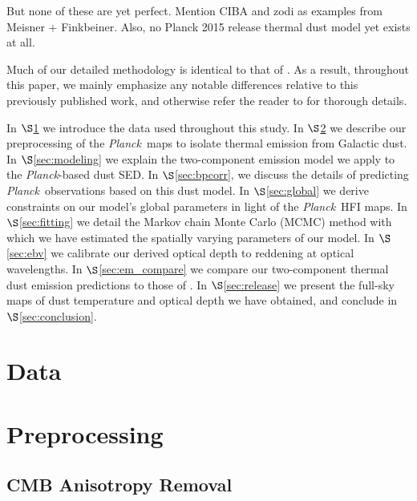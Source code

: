 \documentclass{emulateapj}
\newcommand{\PLANCK}{{\it Planck}}
\begin{document}
But none of these are yet perfect. Mention CIBA and zodi as examples from
Meisner + Finkbeiner. Also, no Planck 2015 release thermal dust model yet
exists at all.

Much of our detailed methodology is identical to that of \cite{meisner15}. As a
result, throughout this paper, we mainly emphasize any notable differences 
relative to this previously published work, and otherwise refer the reader to 
\cite{meisner15} for thorough details.

In $\S$\ref{sec:data} we introduce the data used throughout this study. In
$\S$\ref{sec:prepro} we describe our preprocessing of the \PLANCK~maps to
isolate thermal emission from Galactic dust. In $\S$\ref{sec:modeling} we
explain the two-component emission model we apply to the \PLANCK-based dust
SED. In $\S$\ref{sec:bpcorr}, we discuss the details of predicting
\PLANCK~observations based on this dust model. In $\S$\ref{sec:global} we
derive constraints on our model's global parameters in light of the \PLANCK~HFI
maps. In $\S$\ref{sec:fitting} we detail the Markov chain Monte Carlo (MCMC)
method with which we have estimated the spatially varying parameters of our
model. In $\S$\ref{sec:ebv} we calibrate our derived optical depth to reddening
at optical wavelengths. In $\S$\ref{sec:em_compare} we compare our
two-component thermal dust emission predictions to those of \cite{planckdust}.
In $\S$\ref{sec:release} we present the full-sky maps of dust temperature and
optical depth we have obtained, and conclude in $\S$\ref{sec:conclusion}.

\section{Data}
\label{sec:data}

\section{Preprocessing}
\label{sec:prepro}

\subsection{CMB Anisotropy Removal}
\label{sec:cmb}
\end{document}

